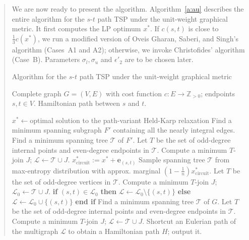 \documentclass[11pt,letterpaper]{article}
\newcommand{\st}{\mbox{$s$-$t$} }
\begin{document}
\begin{quote}
We are now ready to present the algorithm. Algorithm~\ref{a:au} describes the entire algorithm for the \st path TSP under the unit-weight graphical metric. It first computes the LP optimum $x^*$. If $c(s,t)$ is close to $\frac{1}{3}c(x^*)$, we run a modified version of Oveis Gharan, Saberi, and Singh's algorithm (Cases~A1 and A2); otherwise, we invoke Christofides' algorithm (Case~B). Parameters $\sigma_l,\sigma_u$ and $\epsilon'_2$ are to be chosen later.

\begin{algorithm}[ht]
\caption{Algorithm for the \st path TSP under the unit-weight graphical metric}
\label{a:au}
\begin{algorithmic}[1]
	\REQUIRE Complete graph $G=(V,E)$ with cost function $c:E\to\mathbb{Z}_{>0}$; endpoints $s,t\in V$.
	\ENSURE Hamiltonian path between $s$ and $t$.

	\STATE $x^*\gets$optimal solution to the path-variant Held-Karp relaxation
			\STATE Find a minimum spanning subgraph $F'$ containing all the nearly integral edges.
			\STATE Find a minimum spanning tree $\mathscr{T}$ of $F'$.
			\STATE Let $T$ be the set of odd-degree internal points and even-degree endpoints in $\mathscr{T}$.
			\STATE Compute a minimum $T$-join $J$; $\mathscr{L} \gets \mathscr{T}\cup J$.
		\ELSE[Case A2]
			\STATE $x^*_{\mathrm{circuit}} := x^*+\mathbf{\mathbf{e}}_{(s,t)}$
			\STATE Sample spanning tree $\mathscr{T}$ from max-entropy distribution with approx. marginal $(1-\frac{1}{n}) x^*_{\mathrm{circuit}}$.
			\STATE Let $T$ be the set of odd-degree vertices in $\mathscr{T}$.
			\STATE Compute a minimum $T$-join $J$; $\mathscr{L}_0 \gets \mathscr{T}\cup J$.
			\STATE \textbf{if} $(s,t)\in \mathscr{L}_0$ \textbf{then} $\mathscr{L}\gets \mathscr{L}_0 \setminus\{(s,t)\}$ \textbf{else} $\mathscr{L}\gets \mathscr{L}_0 \cup\{(s,t)\}$ \textbf{end if}
		\ENDIF
	\ELSE[Case B]
		\STATE Find a minimum spanning tree $\mathscr{T}$ of $G$.
		\STATE Let $T$ be the set of odd-degree internal points and even-degree endpoints in $\mathscr{T}$.
		\STATE Compute a minimum $T$-join $J$; $\mathscr{L} \gets \mathscr{T}\cup J$.
	\ENDIF
	\STATE Shortcut an Eulerian path of the multigraph $\mathscr{L}$ to obtain a Hamiltonian path $H$; output it.
\end{algorithmic}
\end{algorithm}


\end{quote}
\end{document}
